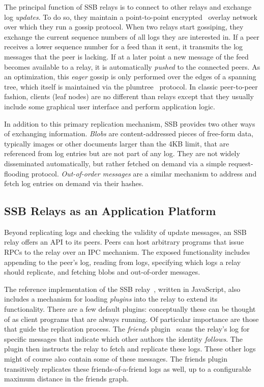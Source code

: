 \documentclass[9pt,sigconf,rewiew]{acmart}
\begin{document}
The principal function of SSB relays is to connect to other relays and exchange log {\em updates}. To do so, they maintain a point-to-point encrypted~\cite{tarr2015secrethandshake} overlay network over which they run a gossip protocol. When two relays start gossiping, they exchange the current sequence numbers of all logs they are interested in. If a peer receives a lower sequence number for a feed than it sent, it transmits the log messages that the peer is lacking. If at a later point a new message of the feed becomes available to a relay, it is automatically \textit{pushed} to the connected peers. As an optimization, this {\em eager} gossip is only performed over the edges of a spanning tree, which itself is maintained via the plumtree~\cite{leitao2007epidemic} protocol. In classic peer-to-peer fashion, clients (leaf nodes) are no different than relays except that they usually include some graphical user interface and perform application logic.

In addition to this primary replication mechanism, SSB provides two other ways of exchanging information. {\em Blobs} are content-addressed pieces of free-form data, typically images or other documents larger than the 4KB limit, that are referenced from log entries but are not part of any log. They are not widely disseminated automatically, but rather fetched on demand via a simple request-flooding protocol. {\em Out-of-order messages} are a similar mechanism to address and fetch log entries on demand via their hashes.

\subsection*{SSB Relays as an Application Platform}

Beyond replicating logs and checking the validity of update messages, an SSB relay offers an API to its peers. Peers can host arbitrary programs that issue RPCs to the relay over an IPC mechanism. The exposed functionality includes appending to the peer's log, reading from logs, specifying which logs a relay should replicate, and fetching blobs and out-of-order messages.

The reference implementation of the SSB relay~\cite{ssb-server}, written in JavaScript, also includes a mechanism for loading {\em plugins} into the relay to extend its functionality. There are a few default plugins: conceptually these can be thought of as client programs that are always running. Of particular importance are those that guide the replication process. The {\em friends} plugin~\cite{ssb-friends} scans the relay's log for specific messages that indicate which other authors the identity {\em follows}. The plugin then instructs the relay to fetch and replicate these logs. These other logs might of course also contain some of these messages. The friends plugin transitively replicates these friends-of-a-friend logs as well, up to a configurable maximum distance in the friends graph.
\end{document}
